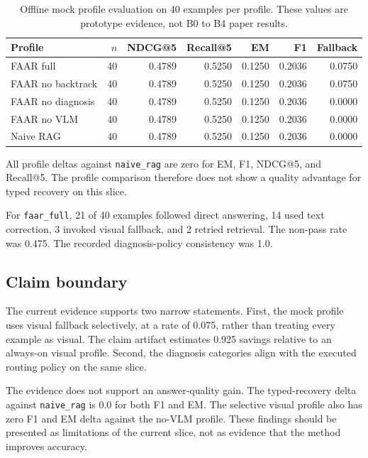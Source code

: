 \documentclass[10pt,twocolumn]{article}
\begin{document}
\begin{table}[H]
\centering
\caption{Offline mock profile evaluation on 40 examples per profile. These values are prototype evidence, not B0 to B4 paper results.}
\label{tab:profiles}
\scriptsize
\begin{tabularx}{\columnwidth}{@{}Yrrrrrr@{}}
\toprule
Profile & $n$ & NDCG@5 & Recall@5 & EM & F1 & Fallback \\
\midrule
FAAR full & 40 & 0.4789 & 0.5250 & 0.1250 & 0.2036 & 0.0750 \\
FAAR no backtrack & 40 & 0.4789 & 0.5250 & 0.1250 & 0.2036 & 0.0750 \\
FAAR no diagnosis & 40 & 0.4789 & 0.5250 & 0.1250 & 0.2036 & 0.0000 \\
FAAR no VLM & 40 & 0.4789 & 0.5250 & 0.1250 & 0.2036 & 0.0000 \\
Naive RAG & 40 & 0.4789 & 0.5250 & 0.1250 & 0.2036 & 0.0000 \\
\bottomrule
\end{tabularx}
\end{table}

All profile deltas against \texttt{naive\_rag} are zero for EM, F1, NDCG@5, and Recall@5. The profile comparison therefore does not show a quality advantage for typed recovery on this slice.

For \texttt{faar\_full}, 21 of 40 examples followed direct answering, 14 used text correction, 3 invoked visual fallback, and 2 retried retrieval. The non-pass rate was 0.475. The recorded diagnosis-policy consistency was 1.0.

\subsection{Claim boundary}

The current evidence supports two narrow statements. First, the mock profile uses visual fallback selectively, at a rate of 0.075, rather than treating every example as visual. The claim artifact estimates 0.925 savings relative to an always-on visual profile. Second, the diagnosis categories align with the executed routing policy on the same slice.

The evidence does not support an answer-quality gain. The typed-recovery delta against \texttt{naive\_rag} is 0.0 for both F1 and EM. The selective visual profile also has zero F1 and EM delta against the no-VLM profile. These findings should be presented as limitations of the current slice, not as evidence that the method improves accuracy.
\end{document}
